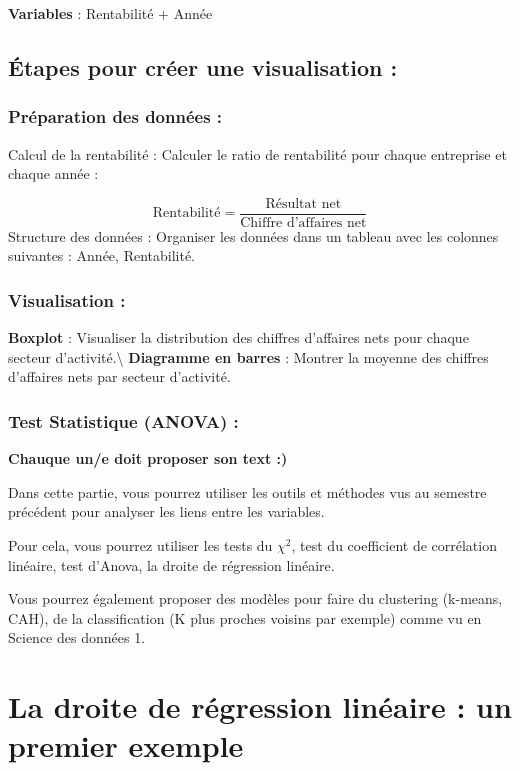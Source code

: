 \documentclass[mstat,12pt]{unswthesis}
\begin{document}
\bigskip

\textbf{Variables} : Rentabilité + Année

\subsection{Étapes pour créer une visualisation
:}\label{uxe9tapes-pour-cruxe9er-une-visualisation-4}

\subsubsection{Préparation des données
:}\label{pruxe9paration-des-donnuxe9es}

Calcul de la rentabilité : Calculer le ratio de rentabilité pour chaque
entreprise et chaque année :

\[
\text{Rentabilité} = \frac{\text{Résultat net}}{\text{Chiffre d'affaires net}}
\] Structure des données : Organiser les données dans un tableau avec
les colonnes suivantes : Année, Rentabilité.

\subsubsection{Visualisation :}\label{visualisation-1}

\textbf{Boxplot} : Visualiser la distribution des chiffres d'affaires
nets pour chaque secteur d'activité.\textbackslash{} \textbf{Diagramme
en barres} : Montrer la moyenne des chiffres d'affaires nets par secteur
d'activité.

\subsubsection{Test Statistique (ANOVA)
:}\label{test-statistique-anova-1}

\textbf{Chauque un/e doit proposer son text :) }

Dans cette partie, vous pourrez utiliser les outils et méthodes vus au
semestre précédent pour analyser les liens entre les variables.

Pour cela, vous pourrez utiliser les tests du \(\chi^2\), test du
coefficient de corrélation linéaire, test d'Anova, la droite de
régression linéaire.

Vous pourrez également proposer des modèles pour faire du clustering
(k-means, CAH), de la classification (K plus proches voisins par
exemple) comme vu en Science des données 1.

\section{La droite de régression linéaire : un premier
exemple}\label{la-droite-de-ruxe9gression-linuxe9aire-un-premier-exemple}
\end{document}
